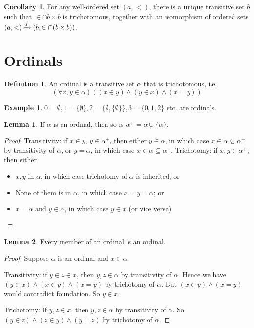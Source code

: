 \documentclass[a4paper]{article}
\theoremstyle{definition}
\newtheorem*{defi}{Definition}
\newtheorem*{eg}{Example}
\newtheorem*{lemma}{Lemma}
\newtheorem*{cor}{Corollary}
\let\stdsection\section
\renewcommand\section{\newpage\stdsection}
\begin{document}
\begin{cor}
  For any well-ordered set $(a, <)$, there is a unique transitive set $b$ such that $\in\cap b\times b$ is trichotomous, together with an isomorphism of ordered sets $(a, <)\xmapsto{f} (b, \in\cap (b\times b))$.
\end{cor}
\section{Ordinals}
\begin{defi}
  An ordinal is a transitive set $\alpha$ that is trichotomous, i.e.
  \[
  (\forall x, y\in \alpha)((x\in y)\wedge (y\in x)\wedge (x = y))
  \]
\end{defi}
\begin{eg}
  $0 = \emptyset, 1 = \{\emptyset\}, 2 = \{\emptyset, \{\emptyset\}\}, 3 = \{0, 1, 2\}$ etc. are ordinals.
\end{eg}

\begin{lemma}
  If $\alpha$ is an ordinal, then so is $\alpha^+ = \alpha\cup \{\alpha\}$. 
\end{lemma}

\begin{proof}
  Transitivity: if $x\in y$, $y\in \alpha^+$, then either $y\in \alpha$, in which case $x\in \alpha\subseteq \alpha^+$ by transitivity of $\alpha$, or $y = \alpha$, in which case $x\in \alpha\subseteq \alpha^+$.
  Trichotomy: if $x, y\in \alpha^+$, then either

  \begin{itemize}
  \item $x, y$ in $\alpha$, in which case trichotomy of $\alpha$ is inherited; or 
  \item None of them is in $\alpha$, in which case $x = y = \alpha$; or
  \item $x = \alpha$ and $y\in \alpha$, in which case $y\in x$ (or vice versa)
  \end{itemize}
\end{proof}

\begin{lemma}
  Every member of an ordinal is an ordinal.
\end{lemma}

\begin{proof}
  Suppose $\alpha$ is an ordinal and $x\in \alpha$.

  Transitivity: if $y\in z\in x$, then $y, z\in \alpha$ by transitivity of $\alpha$. Hence we have $(y\in x) \wedge (x\in y)\wedge (x = y)$ by trichotomy of $\alpha$. But $(x\in y)\wedge (x = y)$ would contradict foundation. So $y\in x$.

  Trichotomy: If $y, z\in x$, then $y, z\in \alpha$ by transitivity of $\alpha$. So $(y\in z)\wedge (z\in y)\wedge (y = z)$ by trichotomy of $\alpha$.
\end{proof}
\end{document}
